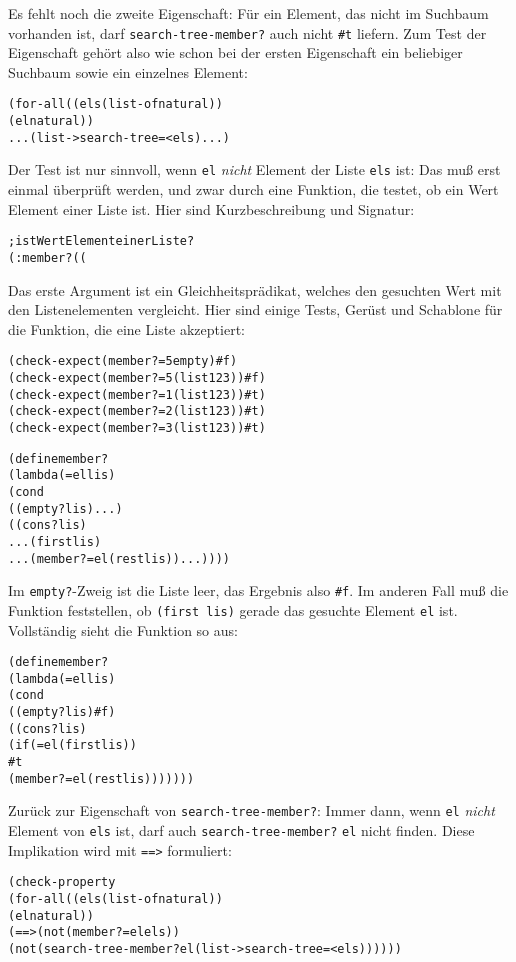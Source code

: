 %
Es fehlt noch die zweite Eigenschaft: Für ein Element, das nicht im
Suchbaum vorhanden ist, darf \texttt{search-tree-member?} auch nicht
\verb|#t| liefern.  Zum Test der Eigenschaft gehört also wie schon bei
der ersten Eigenschaft ein beliebiger Suchbaum sowie ein einzelnes Element:
%
\begin{alltt}
(for-all ((els (list-of natural))
          (el natural))
  ... (list->search-tree = < els) ...)
\end{alltt}
%
Der Test ist nur sinnvoll, wenn \texttt{el} \emph{nicht} Element der Liste
\texttt{els} ist: Das muß erst einmal überprüft werden, und zwar durch
eine Funktion, die testet, ob ein Wert Element einer Liste ist.  Hier
sind Kurzbeschreibung und Signatur:
%
\begin{alltt}
; ist Wert Element einer Liste?
(: member? ((%a %a -> boolean) %a (list-of %a) -> boolean))
\end{alltt}
%
Das erste Argument ist ein Gleichheitsprädikat, welches den gesuchten
Wert mit den Listenelementen vergleicht.  Hier sind einige Tests,
Gerüst und Schablone für die Funktion, die eine Liste akzeptiert:
%
\begin{alltt}
(check-expect (member? = 5 empty) #f)
(check-expect (member? = 5 (list 1 2 3)) #f)
(check-expect (member? = 1 (list 1 2 3)) #t)
(check-expect (member? = 2 (list 1 2 3)) #t)
(check-expect (member? = 3 (list 1 2 3)) #t)

(define member?
  (lambda (= el lis)
    (cond
      ((empty? lis) ...)
      ((cons? lis)
       ... (first lis)
       ... (member? = el (rest lis)) ...))))
\end{alltt}
%
Im \texttt{empty?}-Zweig ist die Liste leer, das Ergebnis also
\verb|#f|.  Im anderen Fall muß die Funktion feststellen, ob
\texttt{(first lis)} gerade das gesuchte Element \texttt{el} ist.
Vollständig sieht die Funktion so aus:
%
\begin{alltt}
(define member?
  (lambda (= el lis)
    (cond
      ((empty? lis) #f)
      ((cons? lis)
       (if (= el (first lis))
           #t
           (member? = el (rest lis)))))))
\end{alltt}
%
Zurück zur Eigenschaft von \texttt{search-tree-member?}: Immer dann,
wenn \texttt{el} \emph{nicht} Element von \texttt{els} ist, darf auch
\texttt{search-tree-member?} \texttt{el} nicht finden.  Diese
Implikation wird mit \texttt{==>} formuliert:
%
\begin{alltt}
(check-property
 (for-all ((els (list-of natural))
           (el natural))
   (==> (not (member? = el els))
        (not (search-tree-member? el (list->search-tree = < els)))))) 
\end{alltt}
%

